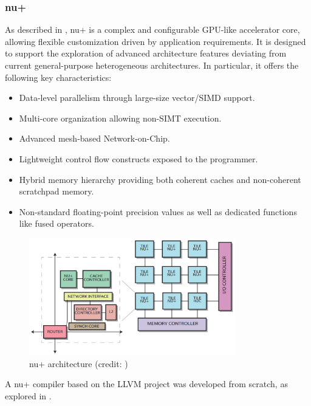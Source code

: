 \subsubsection{nu+}

As described in \cite{exploring_manycore_architectures_through_the_mango_approach}, nu+ is a complex and configurable GPU-like accelerator core, allowing flexible customization driven by application requirements. It is designed to support the exploration of advanced architecture features deviating from current general-purpose heterogeneous architectures. In particular, it offers the following key characteristics:

\begin{itemize}
    \item Data-level parallelism through large-size vector/SIMD support.
    \item Multi-core organization allowing non-SIMT execution.
    \item Advanced mesh-based Network-on-Chip.
    \item Lightweight control flow constructs exposed to the programmer.
    \item Hybrid memory hierarchy providing both coherent caches and non-coherent scratchpad memory.
    \item Non-standard floating-point precision values as well as dedicated functions like fused operators.
\end{itemize}

\begin{figure}[ht]
    \centering
    \includegraphics[width=0.8\textwidth]{img/nu+.png}
    \captionsetup{justification=centering}
    \caption{nu+ architecture (credit: \cite{exploring_manycore_architectures_through_the_mango_approach})}
    \label{fig:nu_arch}
\end{figure}

A nu+ compiler based on the LLVM project was developed from scratch, as explored in \cite{mango_exploring_manycore_architectures_2.1}.

